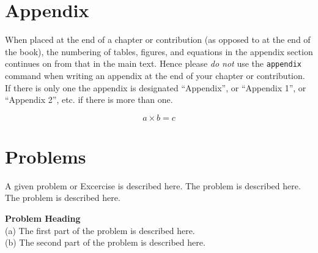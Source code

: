 \section*{Appendix}
%
When placed at the end of a chapter or contribution (as opposed to at the end of the book), the numbering of tables, figures, and equations in the appendix section continues on from that in the main text. Hence please \textit{do not} use the \verb|appendix| command when writing an appendix at the end of your chapter or contribution. If there is only one the appendix is designated ``Appendix'', or ``Appendix 1'', or ``Appendix 2'', etc. if there is more than one.

\begin{equation}
a \times b = c
\end{equation}
\section*{Problems}
%
\begin{prob}
\label{prob1}
A given problem or Excercise is described here. The
problem is described here. The problem is described here.
\end{prob}

\begin{prob}
\label{prob2}
\textbf{Problem Heading}\\
(a) The first part of the problem is described here.\\
(b) The second part of the problem is described here.
\end{prob}


